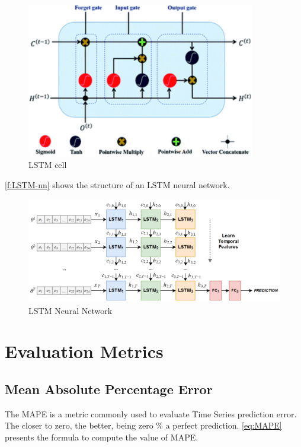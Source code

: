 \begin{figure}[h]
\centering
\includegraphics[width=10cm]{figures/Ch2/LSTM_cell.pdf}
\caption{LSTM cell \cite{Guo2020}}
\label{f:LSTM-cell}
\end{figure}

\autoref{f:LSTM-nn} shows the structure of an \ac{LSTM} neural network.

\begin{figure}[h]
\centering
\includegraphics[width=\linewidth]{figures/Ch2/LSTM_nn.pdf}
\caption{LSTM Neural Network \cite{zapata2019}}
\label{f:LSTM-nn}
\end{figure}



\section{Evaluation Metrics}
\label{sec:section_Example}

\subsection{Mean Absolute Percentage Error}
The \ac{MAPE} is a metric commonly used to evaluate Time Series prediction error. The closer to zero, the better, being zero \% a perfect prediction. 
\autoref{eq:MAPE} presents the formula to compute the value of \ac{MAPE}.

